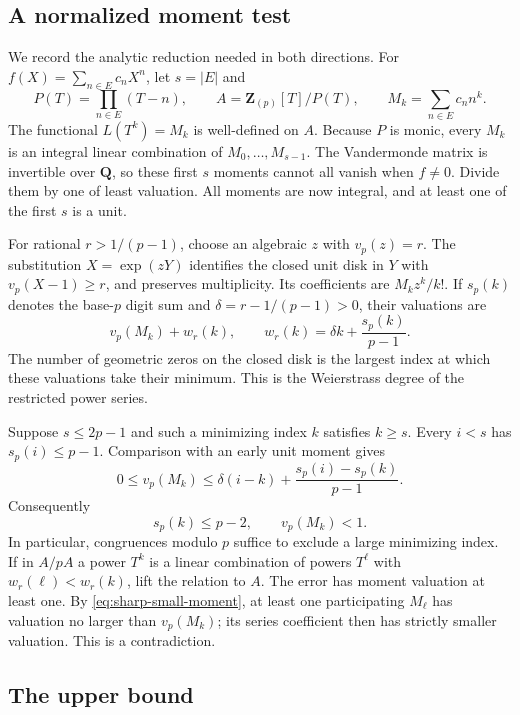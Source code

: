 \subsection{A normalized moment test}

We record the analytic reduction needed in both directions.  For
$f(X)=\sum_{n\in E}c_nX^n$, let $s=|E|$ and
\[
 P(T)=\prod_{n\in E}(T-n),\qquad
 A=\mathbf Z_{(p)}[T]/P(T),\qquad
 M_k=\sum_{n\in E}c_n n^k.
\]
The functional $L(T^k)=M_k$ is well-defined on $A$.  Because $P$ is
monic, every $M_k$ is an integral linear combination of
$M_0,\ldots,M_{s-1}$.  The Vandermonde matrix is invertible over
$\mathbf Q$, so these first $s$ moments cannot all vanish when $f\ne0$.
Divide them by one of least valuation.  All moments are now integral,
and at least one of the first $s$ is a unit.

For rational $r>1/(p-1)$, choose an algebraic $z$ with $v_p(z)=r$.
The substitution $X=\exp(zY)$ identifies the closed unit disk in $Y$
with $v_p(X-1)\ge r$, and preserves multiplicity.  Its coefficients are
$M_kz^k/k!$.  If $s_p(k)$ denotes the base-$p$ digit sum and
$\delta=r-1/(p-1)>0$, their valuations are
\begin{equation}\label{eq:sharp-weight}
 v_p(M_k)+w_r(k),\qquad
 w_r(k)=\delta k+\frac{s_p(k)}{p-1}.
\end{equation}
The number of geometric zeros on the closed disk is the largest index
at which these valuations take their minimum.  This is the
Weierstrass degree of the restricted power series.

Suppose $s\le2p-1$ and such a minimizing index $k$ satisfies $k\ge s$.
Every $i<s$ has $s_p(i)\le p-1$.  Comparison with an early unit moment
gives
\[
 0\le v_p(M_k)
 \le\delta(i-k)+\frac{s_p(i)-s_p(k)}{p-1}.
\]
Consequently
\begin{equation}\label{eq:sharp-small-moment}
               s_p(k)\le p-2,\qquad v_p(M_k)<1.
\end{equation}
In particular, congruences modulo $p$ suffice to exclude a large
minimizing index.  If in $A/pA$ a power $T^k$ is a linear combination
of powers $T^\ell$ with
$w_r(\ell)<w_r(k)$, lift the relation to $A$.  The error has moment
valuation at least one.  By \eqref{eq:sharp-small-moment}, at least one
participating $M_\ell$ has valuation no larger than $v_p(M_k)$; its
series coefficient then has strictly smaller valuation.  This is a
contradiction.

\subsection{The upper bound}

